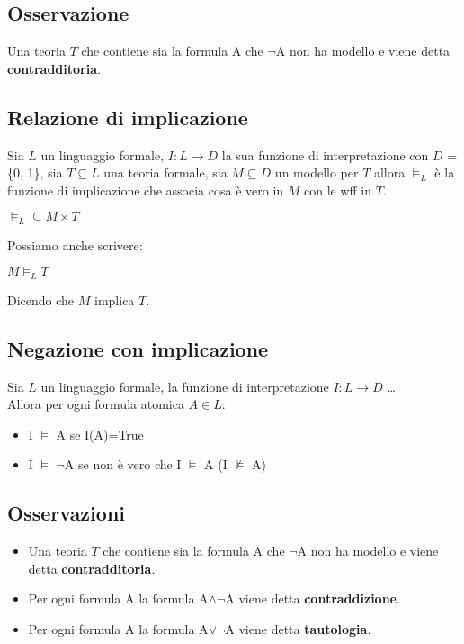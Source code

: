 \documentclass{book}
\begin{document}
    \subsection{Osservazione}
    Una teoria $T$ che contiene sia la formula A che $\lnot$A non ha modello e viene detta \textbf{contradditoria}.

    \subsection{Relazione di implicazione}
    Sia $L$ un linguaggio formale, $I:L \to D$ la sua funzione di interpretazione con $D$ = \{0, 1\}, sia $T \subseteq L$ una teoria formale, sia $M \subseteq D$ un modello per $T$ allora $\models_L$ è la funzione di implicazione che associa cosa è vero in $M$ con le wff in $T$.
    \begin{center}
        $\models_L \subseteq M \times T$
    \end{center}
    Possiamo anche scrivere:
    \begin{center}
        $M \models_L T$
    \end{center}
    Dicendo che $M$ implica $T$.

    \subsection{Negazione con implicazione}
    Sia $L$ un linguaggio formale, la funzione di interpretazione $I:L \to D$ \dots\\
    Allora per ogni formula atomica $A \in L$:
    \begin{itemize}
        \item I $\models$ A se I(A)=True
        \item I $\models$ $\lnot$A se non è vero che I $\models$ A (I $\not\models$ A)
    \end{itemize}

    \subsection{Osservazioni}
    \begin{itemize}
        \item Una teoria $T$ che contiene sia la formula A che $\lnot$A non ha modello e viene detta \textbf{contradditoria}.
        \item Per ogni formula A la formula A$\land \lnot$A viene detta \textbf{contraddizione}.
        \item Per ogni formula A la formula A$\lor \lnot$A viene detta \textbf{tautologia}.
    \end{itemize}
\end{document}
